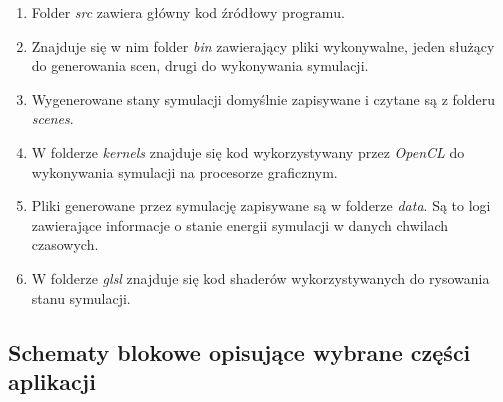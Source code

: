 \documentclass[12pt, letterpaper]{report}
\begin{document}
    \begin{enumerate}
        \item Folder \emph{src} zawiera główny kod źródłowy programu.
        
        \item Znajduje się w nim folder \emph{bin} zawierający pliki wykonywalne, 
        jeden służący do generowania scen, drugi do wykonywania symulacji. 

        \item Wygenerowane stany symulacji domyślnie zapisywane i czytane są z folderu \emph{scenes}.
        
        \item W folderze \emph{kernels} znajduje się kod wykorzystywany przez \emph{OpenCL} do 
        wykonywania symulacji na procesorze graficznym.
        
        \item Pliki generowane przez symulację zapisywane są w folderze \emph{data}. 
        Są to logi zawierające informacje o stanie energii symulacji w danych chwilach czasowych.

        \item W folderze \emph{glsl} znajduje się kod shaderów wykorzystywanych do rysowania stanu symulacji.
    \end{enumerate}

    \clearpage

    \subsection{Schematy blokowe opisujące wybrane części aplikacji}
\end{document}
